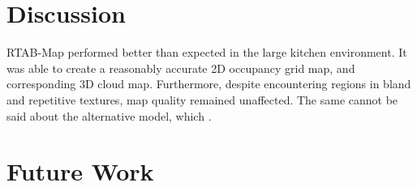 \documentclass[a4paper]{article}
\begin{document}
\newpage

\section{Discussion}
RTAB-Map performed better than expected in the large kitchen environment. It was able to create a reasonably accurate 2D occupancy grid map, and corresponding 3D cloud map. Furthermore, despite encountering regions in bland and repetitive textures, map quality remained unaffected. The same cannot be said about the alternative model, which .



\section{Future Work}




\end{document}
